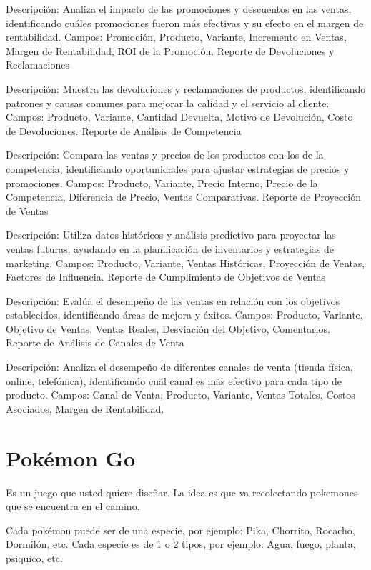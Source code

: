 \documentclass[
  letterpaper,
  DIV=11,
  numbers=noendperiod]{scrreprt}
\begin{document}
Descripción: Analiza el impacto de las promociones y descuentos en las
ventas, identificando cuáles promociones fueron más efectivas y su
efecto en el margen de rentabilidad. Campos: Promoción, Producto,
Variante, Incremento en Ventas, Margen de Rentabilidad, ROI de la
Promoción. Reporte de Devoluciones y Reclamaciones

Descripción: Muestra las devoluciones y reclamaciones de productos,
identificando patrones y causas comunes para mejorar la calidad y el
servicio al cliente. Campos: Producto, Variante, Cantidad Devuelta,
Motivo de Devolución, Costo de Devoluciones. Reporte de Análisis de
Competencia

Descripción: Compara las ventas y precios de los productos con los de la
competencia, identificando oportunidades para ajustar estrategias de
precios y promociones. Campos: Producto, Variante, Precio Interno,
Precio de la Competencia, Diferencia de Precio, Ventas Comparativas.
Reporte de Proyección de Ventas

Descripción: Utiliza datos históricos y análisis predictivo para
proyectar las ventas futuras, ayudando en la planificación de
inventarios y estrategias de marketing. Campos: Producto, Variante,
Ventas Históricas, Proyección de Ventas, Factores de Influencia. Reporte
de Cumplimiento de Objetivos de Ventas

Descripción: Evalúa el desempeño de las ventas en relación con los
objetivos establecidos, identificando áreas de mejora y éxitos. Campos:
Producto, Variante, Objetivo de Ventas, Ventas Reales, Desviación del
Objetivo, Comentarios. Reporte de Análisis de Canales de Venta

Descripción: Analiza el desempeño de diferentes canales de venta (tienda
física, online, telefónica), identificando cuál canal es más efectivo
para cada tipo de producto. Campos: Canal de Venta, Producto, Variante,
Ventas Totales, Costos Asociados, Margen de Rentabilidad.


\chapter{Pokémon Go}\label{pokuxe9mon-go}

Es un juego que usted quiere diseñar. La idea es que va recolectando
pokemones que se encuentra en el camino.

Cada pokémon puede ser de una especie, por ejemplo: Pika, Chorrito,
Rocacho, Dormilón, etc. Cada especie es de 1 o 2 tipos, por ejemplo:
Agua, fuego, planta, psiquico, etc.
\end{document}
